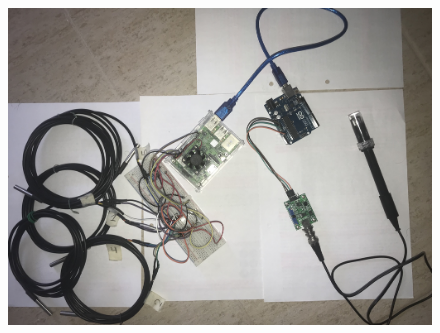     \begin{figure}[t]
    \centering
        \includegraphics[scale=0.11]{hardware/SistemaEnsamblado.jpeg}
        \label{fig:EsquemaCompletoHardware}
    \end{figure}

    
